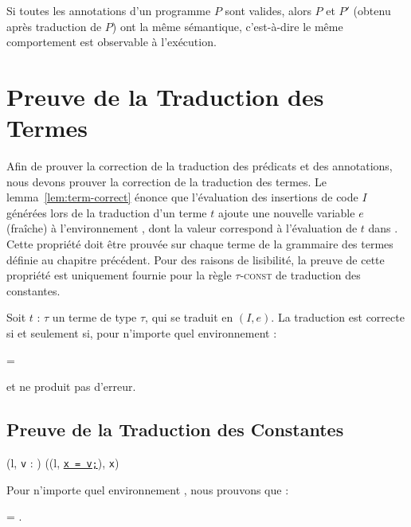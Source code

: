 \begin{theorem}
  Si toutes les annotations d'un programme $P$ sont valides, alors $P$ et $P'$
  (obtenu après traduction de $P$) ont la même sémantique, c'est-à-dire le même
  comportement est observable à l'exécution.
\end{theorem}



\section{Preuve de la Traduction des Termes}
\label{sec:term-translation}

Afin de prouver la correction de la traduction des prédicats et des annotations,
nous devons prouver la correction de la traduction des termes.
Le lemma~\ref{lem:term-correct} énonce que l'évaluation des insertions de code
$I$ générées lors de la traduction d'un terme $t$ ajoute une nouvelle variable
$e$ (fraîche) à l'environnement \env, dont la valeur correspond à l'évaluation
de $t$ dans \env.
Cette propriété doit être prouvée sur chaque terme de la grammaire des termes
définie au chapitre précédent.
Pour des raisons de lisibilité, la preuve de cette propriété est uniquement
fournie pour la règle \textsc{$\tau$-const} de traduction des constantes.

\begin{lemma}
  \label{lem:term-correct}
  Soit $t$ : $\tau$ un terme de type $\tau$, qui se traduit en $(I, e)$.
  La traduction est correcte si et seulement si, pour n'importe quel
  environnement \env :

   = 

  et  ne produit pas d'erreur.
\end{lemma}


\subsection{Preuve de la Traduction des Constantes}

{
  { (l, \mbox{\lstinline'v'} : ) 
    ((l, \Zinit\underline{\mbox{\lstinline'x = v;'}}), \mbox{\lstinline'x'}) }
}

Pour n'importe quel environnement \env, nous prouvons que :

= .


